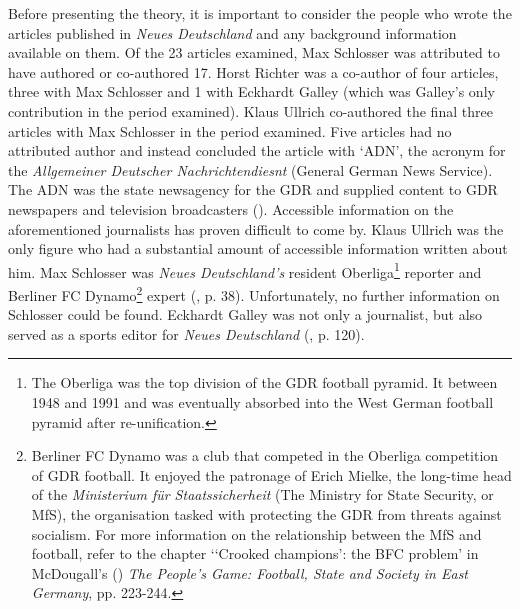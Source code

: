 Before presenting the theory, it is important to consider the people who wrote the articles published in \textit{Neues Deutschland} and any background information available on them. Of the 23 articles examined, Max Schlosser was attributed to have authored or co-authored 17. Horst Richter was a co-author of four articles, three with Max Schlosser and 1 with Eckhardt Galley (which was Galley’s only contribution in the period examined). Klaus Ullrich co-authored the final three articles with Max Schlosser in the period examined. Five articles had no attributed author and instead concluded the article with ‘ADN’, the acronym for the \textit{Allgemeiner Deutscher Nachrichtendiesnt} (General German News Service). The ADN was the state newsagency for the GDR and supplied content to GDR newspapers and television broadcasters (\cite{wilke1998}). Accessible information on the aforementioned journalists has proven difficult to come by. Klaus Ullrich was the only figure who had a substantial amount of accessible information written about him. Max Schlosser was \textit{Neues Deutschland’s} resident Oberliga\footnote{The Oberliga was the top division of the GDR football pyramid. It between 1948 and 1991 and was eventually absorbed into the West German football pyramid after re-unification.} reporter and Berliner FC Dynamo\footnote{Berliner FC Dynamo was a club that competed in the Oberliga competition of GDR football. It enjoyed the patronage of Erich Mielke, the long-time head of the \textit{Ministerium für Staatssicherheit} (The Ministry for State Security, or MfS), the organisation tasked with protecting the GDR from threats against socialism. For more information on the relationship between the MfS and football, refer to the chapter ‘‘Crooked champions’: the BFC problem’ in McDougall’s (\citeyear{mcdougall2014}) \textit{The People’s Game: Football, State and Society in East Germany}, pp. 223-244.} expert (\cite{kannowski1999}, p. 38). Unfortunately, no further information on Schlosser could be found. Eckhardt Galley was not only a journalist, but also served as a sports editor for \textit{Neues Deutschland} (\cite{landes2011}, p. 120).

